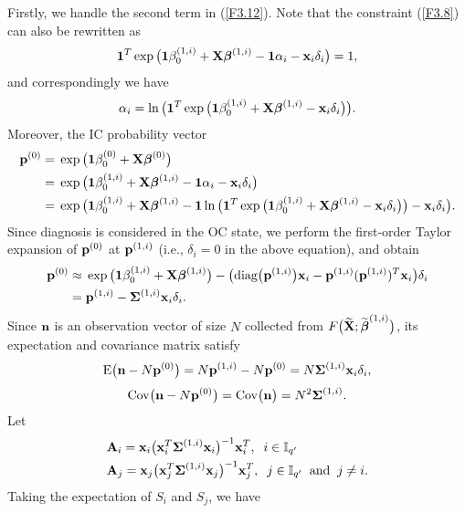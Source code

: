 Firstly, we handle the second term in (\ref{F3.12}). Note that the constraint
(\ref{F3.8}) can also be rewritten as
\[
\boldsymbol{1}^T\exp\big(\boldsymbol{1}\beta^{(1,i)}_0 +{\bf X}\boldsymbol\beta^{(1,i)}-\boldsymbol{1}\alpha_i-{\bf
x}_i\delta_i\big)=1,
\]
and correspondingly we have
\[
\alpha_i=\ln\big(\boldsymbol{1}^T\exp\big(\boldsymbol{1}\beta^{(1,i)}_0 +{\bf
X}\boldsymbol\beta^{(1,i)}-{\bf x}_i\delta_i\big)\big).
\]
Moreover, the IC probability vector
\begin{align*}
{\bf p}^{(0)}=&\;\exp\big(\boldsymbol{1}\beta^{(0)}_0
+{\bf X}\boldsymbol\beta^{(0)}\big)\\
=&\;\exp\big(\boldsymbol{1}\beta^{(1,i)}_0+{\bf X}\boldsymbol\beta^{(1,i)}-\boldsymbol{1}\alpha_i-{\bf
x}_i\delta_i\big)\\
=&\;\exp\big(\boldsymbol{1}\beta^{(1,i)}_0+{\bf X}\boldsymbol\beta^{(1,i)}-
\boldsymbol{1}\ln\big(\boldsymbol{1}^T\exp\big(\boldsymbol{1}\beta^{(1,i)}_0 +{\bf X}\boldsymbol\beta^{(1,i)}-{\bf
x}_i\delta_i\big)\big)-{\bf x}_i\delta_i\big).
\end{align*}
Since diagnosis is considered in the OC state, we perform the first-order Taylor
expansion of ${\bf p}^{(0)}$ at ${\bf p}^{(1,i)}$ (i.e., $\delta_i=0$ in the above
equation), and obtain
\begin{align*}
{\bf p}^{(0)}\approx&\;\exp\big(\boldsymbol{1}\beta^{(1,i)}_0+{\bf
X}\boldsymbol\beta^{(1,i)}\big)-\big(\mathrm{diag}\big({\bf p}^{(1,i)}\big){\bf
x}_i-{\bf p}^{(1,i)}({\bf p}^{(1,i)})^T{\bf x}_i\big)\delta_i\\
=&\;{\bf p}^{(1,i)}-\boldsymbol{\Sigma}^{(1,i)}{\bf x}_i\delta_i.
\end{align*}
Since ${\bf n}$ is an observation vector of size $N$ collected from
$F\big(\widetilde{{\bf X}};\widetilde{\boldsymbol{\beta}}^{(1,i)}\big)$, its expectation and
covariance matrix satisfy
\[
\mathrm{E}\big({\bf n}-N{\bf p}^{(0)}\big)=N{\bf p}^{(1,i)}-N{\bf
p}^{(0)}=N\boldsymbol{\Sigma}^{(1,i)}{\bf x}_i\delta_i,
\]
\[
\mathrm{Cov}\big({\bf n}-N{\bf p}^{(0)}\big)=\mathrm{Cov}\big({\bf n}\big)=N^2\boldsymbol{\Sigma}^{(1,i)}.
\]
Let
\begin{align*}
&{\bf A}_i={\bf x}_i\big({\bf x}_i^T\boldsymbol{\Sigma}^{(1,i)}{\bf
x}_i\big)^{-1}{\bf x}_i^T,\;\;i\in\mathbb{I}_{q^{\prime}}\\
&{\bf A}_j={\bf x}_j\big({\bf x}_j^T\boldsymbol{\Sigma}^{(1,i)}{\bf x}_j\big)^{-1}{\bf
x}_j^T,\;\;j\in\mathbb{I}_{q^{\prime}}\;\;\textrm{and}\;\;j\ne i.
\end{align*}
Taking the expectation of $S_i$ and $S_j$, we have
